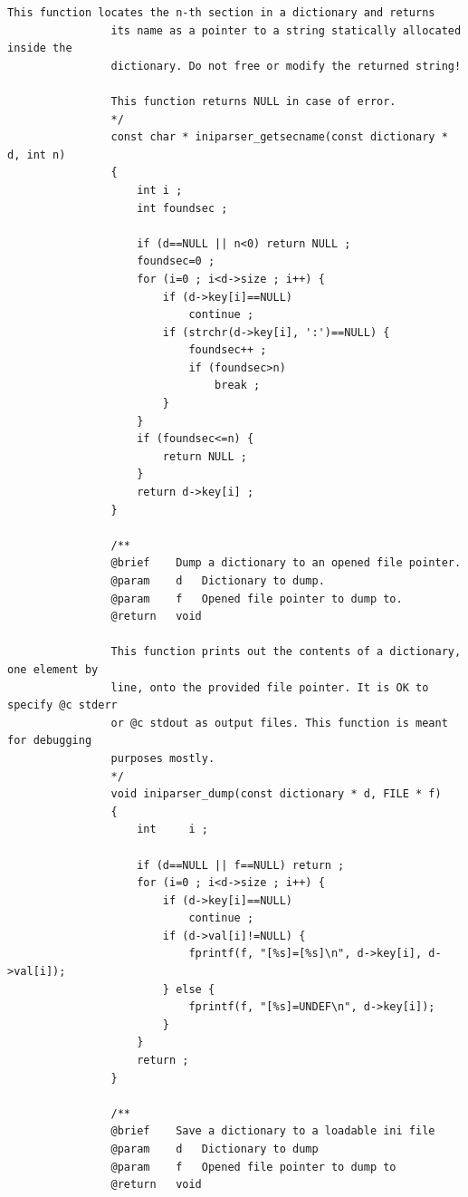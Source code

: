 \documentclass{article}
\begin{document}
\begin{Verbatim}[gobble=8]
                This function locates the n-th section in a dictionary and returns
                its name as a pointer to a string statically allocated inside the
                dictionary. Do not free or modify the returned string!
                
                This function returns NULL in case of error.
                */
                const char * iniparser_getsecname(const dictionary * d, int n)
                {
                    int i ;
                    int foundsec ;
                
                    if (d==NULL || n<0) return NULL ;
                    foundsec=0 ;
                    for (i=0 ; i<d->size ; i++) {
                        if (d->key[i]==NULL)
                            continue ;
                        if (strchr(d->key[i], ':')==NULL) {
                            foundsec++ ;
                            if (foundsec>n)
                                break ;
                        }
                    }
                    if (foundsec<=n) {
                        return NULL ;
                    }
                    return d->key[i] ;
                }
                
                /**
                @brief    Dump a dictionary to an opened file pointer.
                @param    d   Dictionary to dump.
                @param    f   Opened file pointer to dump to.
                @return   void
                
                This function prints out the contents of a dictionary, one element by
                line, onto the provided file pointer. It is OK to specify @c stderr
                or @c stdout as output files. This function is meant for debugging
                purposes mostly.
                */
                void iniparser_dump(const dictionary * d, FILE * f)
                {
                    int     i ;
                
                    if (d==NULL || f==NULL) return ;
                    for (i=0 ; i<d->size ; i++) {
                        if (d->key[i]==NULL)
                            continue ;
                        if (d->val[i]!=NULL) {
                            fprintf(f, "[%s]=[%s]\n", d->key[i], d->val[i]);
                        } else {
                            fprintf(f, "[%s]=UNDEF\n", d->key[i]);
                        }
                    }
                    return ;
                }
                
                /**
                @brief    Save a dictionary to a loadable ini file
                @param    d   Dictionary to dump
                @param    f   Opened file pointer to dump to
                @return   void
                

\end{Verbatim}
\end{document}
